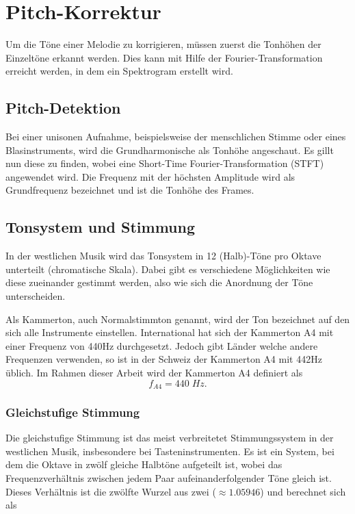 %
%
%
%
\section{Pitch-Korrektur
\label{autotune:section:pitchKorrektur}}
Um die Töne einer Melodie zu korrigieren, müssen zuerst die Tonhöhen der Einzeltöne erkannt werden.
Dies kann mit Hilfe der Fourier-Transformation erreicht werden, in dem ein Spektrogram erstellt wird.

\subsection{Pitch-Detektion
\label{autotune:subsection:pitchDetektion}}
Bei einer unisonen Aufnahme, beispielsweise der menschlichen Stimme oder eines Blasinstruments, wird die Grundharmonische als Tonhöhe angeschaut.
Es gillt nun diese zu finden, wobei eine Short-Time Fourier-Transformation (STFT) angewendet wird.
Die Frequenz mit der höchsten Amplitude wird als Grundfrequenz bezeichnet und ist die Tonhöhe des Frames.

\subsection{Tonsystem und Stimmung
\label{autotune:subsection:tonsystemUndStimmung}}
In der westlichen Musik wird das Tonsystem in 12 (Halb)-Töne pro Oktave unterteilt (chromatische Skala).
Dabei gibt es verschiedene Möglichkeiten wie diese zueinander gestimmt werden, also wie sich die Anordnung der Töne unterscheiden.

Als Kammerton, auch Normalstimmton genannt, wird der Ton bezeichnet auf den sich alle Instrumente einstellen.
International hat sich der Kammerton A4 mit einer Frequenz von 440\;Hz durchgesetzt.
Jedoch gibt Länder welche andere Frequenzen verwenden, so ist in der Schweiz der Kammerton A4 mit 442\;Hz üblich.
Im Rahmen dieser Arbeit wird der Kammerton A4 definiert als 
\begin{equation}
    f_{A4}
    =
    440\;Hz.
\end{equation}

\subsubsection{Gleichstufige Stimmung
\label{autotune:subsubsection:gleichstuffigeStimmung}}
Die gleichstufige Stimmung ist das meist verbreitetet Stimmungssystem in der westlichen Musik, insbesondere bei Tasteninstrumenten.
Es ist ein System, bei dem die Oktave in zwölf gleiche Halbtöne aufgeteilt ist, wobei das Frequenzverhältnis zwischen jedem Paar aufeinanderfolgender Töne gleich ist.
Dieses Verhältnis ist die zwölfte Wurzel aus zwei ($\approx 1.05946$) und berechnet sich als

